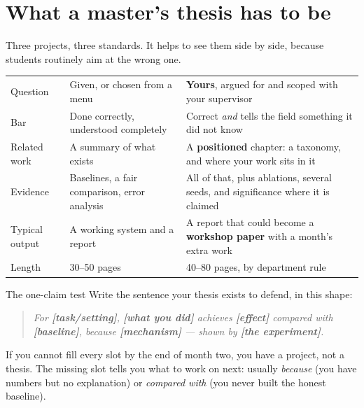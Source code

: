 \documentclass[11pt,a4paper]{article}
\begin{document}
\section{What a master's thesis has to be}

Three projects, three standards. It helps to see them side by side, because
students routinely aim at the wrong one.

\begin{table}[h]
\centering
\small
\begin{tabularx}{\textwidth}{L{2.6cm} X X}
\toprule
 &  &  \\
\midrule
{}
Question & Given, or chosen from a menu & \textbf{Yours}, argued for and scoped
with your supervisor \\
Bar & Done correctly, understood completely & Correct \emph{and} tells the
field something it did not know \\
Related work & A summary of what exists & A \textbf{positioned} chapter: a
taxonomy, and where your work sits in it \\
Evidence & Baselines, a fair comparison, error analysis & All of that, plus
ablations, several seeds, and significance where it is claimed \\
Typical output & A working system and a report & A report that could become a
\textbf{workshop paper} with a month's extra work \\
Length & 30--50 pages & 40--80 pages, by department rule \\
\bottomrule
\end{tabularx}
\end{table}

\begin{cbox}{The one-claim test}
Write the sentence your thesis exists to defend, in this shape:

\begin{quote}\small
\emph{For \textbf{[task/setting]}, \textbf{[what you did]} achieves
\textbf{[effect]} compared with \textbf{[baseline]}, because
\textbf{[mechanism]} --- shown by \textbf{[the experiment]}.}
\end{quote}

If you cannot fill every slot by the end of month two, you have a project, not
a thesis. The missing slot tells you what to work on next: usually
\emph{because} (you have numbers but no explanation) or \emph{compared with}
(you never built the honest baseline).
\end{cbox}
\end{document}
